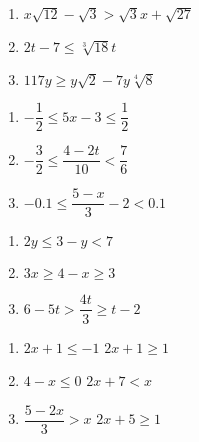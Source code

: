 \documentclass{ximera}
\begin{document}
\begin{multicols}{3}
\begin{enumerate}
\setcounter{enumi}{\value{HW}}

\item $x \sqrt{12} - \sqrt{3} > \sqrt{3} x + \sqrt{27}$

\item  $2t - 7 \leq \sqrt[3]{18} t$

\item   $117y \geq y\sqrt{2} - 7y \sqrt[4]{8}$

\setcounter{HW}{\value{enumi}}
\end{enumerate}
\end{multicols}


\begin{multicols}{3}
\begin{enumerate}
\setcounter{enumi}{\value{HW}}

\item $-\dfrac{1}{2} \leq 5x - 3 \leq \dfrac{1}{2}$
\item $-\dfrac{3}{2} \leq \dfrac{4 - 2t}{10} < \dfrac{7}{6}$
\item $-0.1 \leq \dfrac{5-x}{3} - 2 < 0.1$

\setcounter{HW}{\value{enumi}}
\end{enumerate}
\end{multicols}

\begin{multicols}{3}
\begin{enumerate}
\setcounter{enumi}{\value{HW}}
\item  $2y \leq 3-y < 7$

\item  $3x \geq 4-x \geq 3$

\item  $6-5t > \dfrac{4t}{3} \geq t - 2$

\setcounter{HW}{\value{enumi}}
\end{enumerate}
\end{multicols}


\begin{multicols}{3}
\begin{enumerate}
\setcounter{enumi}{\value{HW}}
\item   $2x+1 \leq -1$  $2x+1 \geq 1$ 
\item   $4-x \leq 0$  $2x+7 < x$
\item   $\dfrac{5-2x}{3} > x$  $2x + 5 \geq 1$ \label{linineqnexlast}

\setcounter{HW}{\value{enumi}}
\end{enumerate}
\end{multicols}
\end{document}
